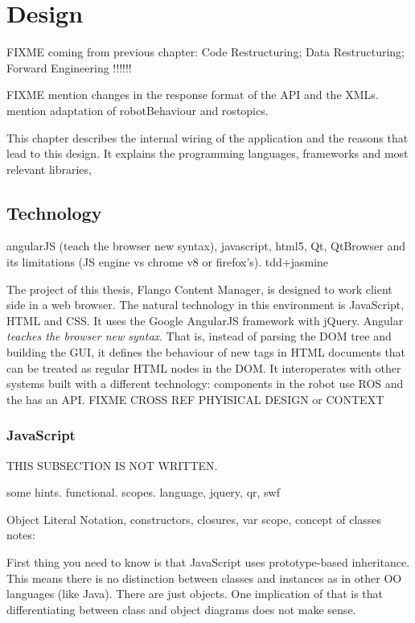 \chapter{Design}
FIXME coming from previous chapter: Code Restructuring; Data Restructuring; Forward Engineering !!!!!!

FIXME  mention changes in the response format of the API and the XMLs. mention adaptation of robotBehaviour and rostopics.
    
This chapter describes the internal wiring of the application and the reasons that lead to this design.
It explains the programming languages, frameworks and most relevant libraries, 

\section{Technology}
angularJS (teach the browser new syntax), javascript, html5, Qt, QtBrowser and its limitations (JS engine vs chrome v8 or firefox's). tdd+jasmine

The project of this thesis, Flango Content Manager, is designed to work client side in a web browser.
The natural technology in this environment is JavaScript, HTML and CSS.
It uses the Google AngularJS framework with jQuery.
Angular \textit{teaches the browser new syntax}.
That is, instead of parsing the \ac{DOM} tree and building the \ac{GUI}, it defines the behaviour of new tags in \ac{HTML} documents that can be treated as regular \ac{HTML} nodes in the \ac{DOM}.
It interoperates with other systems built with a different technology: components in the robot use \ac{ROS} and the \flangobe has an \ac{API}. FIXME CROSS REF PHYISICAL DESIGN or CONTEXT

\subsection{JavaScript}
THIS SUBSECTION  IS NOT WRITTEN.

some hints. functional. scopes.
language, jquery, qr, swf

Object Literal Notation, constructors, closures, var scope, concept of classes
notes:

First thing you need to know is that JavaScript uses prototype-based inheritance. This means there is no distinction between classes and instances as in other OO languages (like Java). There are just objects. One implication of that is that differentiating between class and object diagrams does not make sense.

